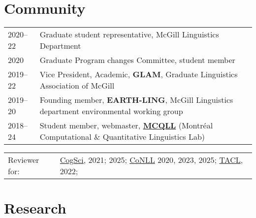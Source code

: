\documentclass[11pt,a4paper]{article}
\begin{document}
  \section{Community}
  \begin{longtable}{p{1.7cm}|p{15cm}}
    \textsc{2020--22}
    &%
    Graduate student representative, McGill Linguistics Department\\
    \textsc{2020}
    &%
    Graduate Program changes Committee, student member\\
    \textsc{2019--22}
    &%
    Vice President, Academic, \textbf{GLAM}, Graduate Linguistics Association of
    McGill\\
    \textsc{2019--20}&%
    Founding member, \textbf{EARTH-LING}, McGill Linguistics department
    environmental working group\\
    \textsc{2018--24}
    &%
    Student member, webmaster, \href{http://mcqll.org}{\textbf{MCQLL}} (Montréal Computational \& Quantitative
    Linguistics Lab)\\
  \end{longtable}
  \begin{longtable}[l]{ll}
    Reviewer for:
    &%
    \href{https://cognitivesciencesociety.org/}{CogSci}, 2021; 2025;
    \href{https://www.conll.org/}{CoNLL} 2020, 2023, 2025;
    \href{https://transacl.org/}{TACL}, 2022;
  \end{longtable}


  \section{Research}

  \vspace{5pt}
  \nocite{%
    lipkin.b:2025arxiv,%
    vigly.j:2025HSP,%
    clark.t:2025HSP,%
    hoover.j:2024phd,%
    rahimi.h:2024,%
    hoover.j:2023,%
    socolof.m:2022coling,%
    hoover.j:2022amlap,%
    hoover.j:2021emnlp,%
    hoover.j:2021wccfl%
  }
  \AtNextBibliography{\small}
  \printbibliography[heading=none]{}
  \vspace{5pt}
\end{document}
